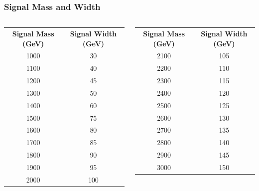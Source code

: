 \documentclass{beamer}
\begin{document}
\begin{frame}
\frametitle{Signal Mass and Width}
\begin{columns}
\begin{column}{0.5\textwidth}
\begin{table}
\begin{tabular}{cc}
\textbf{Signal Mass (GeV)} & \textbf{Signal Width (GeV)} \\
1000 & 30 \\
1100 & 40 \\
1200 & 45 \\
1300 & 50 \\
1400 & 60 \\
1500 & 75 \\
1600 & 80 \\
1700 & 85 \\
1800 & 90 \\
1900 & 95 \\
2000 & 100 \\
\end{tabular}
\end{table}
\end{column}
\begin{column}{0.5\textwidth}
\begin{table}
\begin{tabular}{cc}
\textbf{Signal Mass (GeV)} & \textbf{Signal Width (GeV)} \\
2100 & 105 \\
2200 & 110 \\
2300 & 115 \\
2400 & 120 \\
2500 & 125 \\
2600 & 130 \\
2700 & 135 \\
2800 & 140 \\
2900 & 145 \\
3000 & 150 \\
\end{tabular}
\end{table}
\end{column}
\end{columns}
\end{frame}
\end{document}
